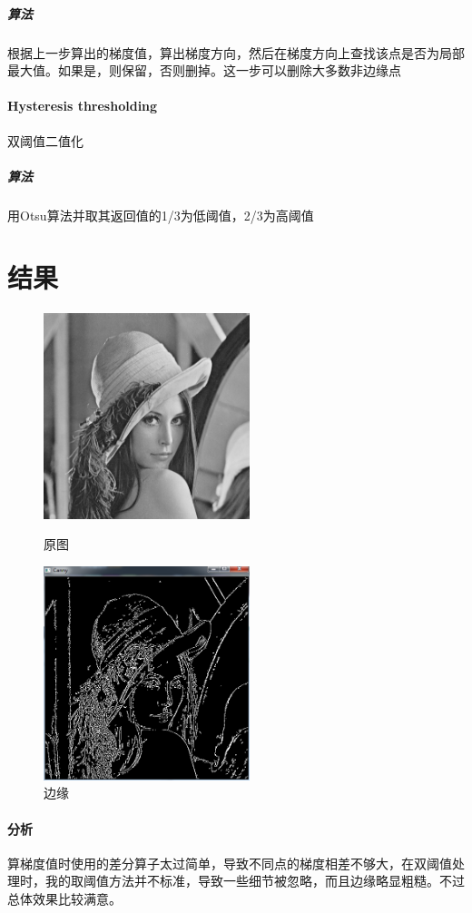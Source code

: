 \documentclass{article}
\begin{document}
            \subparagraph{算法}
                根据上一步算出的梯度值，算出梯度方向，然后在梯度方向上查找该点是否为局部最大值。如果是，则保留，否则删掉。这一步可以删除大多数非边缘点
        \paragraph{Hysteresis thresholding}
            双阈值二值化
            \subparagraph{算法}用Otsu算法并取其返回值的1/3为低阈值，2/3为高阈值
        \section{结果}
            \paragraph{}
                \begin{figure}[htbp]
                    \begin{minipage}[t]{0.5\linewidth}\centering
                    \includegraphics[width=6cm]{test.png}
                    \caption{原图}\label{1-a}
                    \end{minipage}
                    \begin{minipage}[t]{0.5\linewidth}\centering
                    \includegraphics[width=6cm]{result.png}
                    \caption{边缘}\label{1-b}
                    \end{minipage}
                \end{figure}
            \paragraph{分析}
                算梯度值时使用的差分算子太过简单，导致不同点的梯度相差不够大，在双阈值处理时，我的取阈值方法并不标准，导致一些细节被忽略，而且边缘略显粗糙。不过总体效果比较满意。
\end{document}
